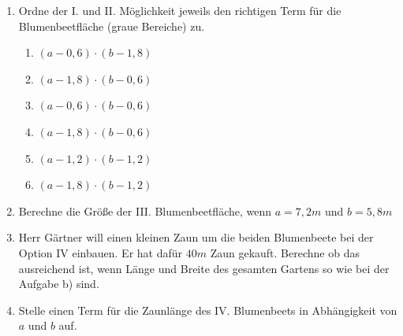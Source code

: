 \documentclass[a4paper,12pt]{article}
\newcommand{\Aufgabe}[1]{
  {
  \vspace*{0.5cm}
  \textsf{\textbf{Aufgabe #1}}
  \vspace*{0.2cm}
  
  }
}
\begin{document}
\begin{enumerate}[label={\alph*)}]
  \item Ordne der I. und II. Möglichkeit jeweils den richtigen Term für die Blumenbeetfläche (graue Bereiche) zu.


\begin{minipage}[t]{0.45\textwidth}
    \begin{enumerate}[label=\arabic*.]
    \item $(a-0,6)\cdot (b-1,8)$
    \item $(a-1,8)\cdot (b-0,6)$
    \item $(a-0,6)\cdot (b-0,6)$
  \end{enumerate}
\end{minipage}
\hspace*{0.15cm}
\begin{minipage}[t]{0.35\textwidth}
    \begin{enumerate}[label=\arabic*.]
    \setcounter{enumii}{3}
    \item $(a-1,8)\cdot (b-0,6)$
    \item $(a-1,2)\cdot (b-1,2)$
    \item $(a-1,8)\cdot (b-1,2)$
  \end{enumerate}
\end{minipage}
    \vspace{10mm}


  \item Berechne die Größe der III. Blumenbeetfläche, wenn $a=7,2m$ und $b=5,8m$
    \vspace{50mm}
  \item Herr Gärtner will einen kleinen Zaun um die beiden Blumenbeete bei der Option IV einbauen. Er hat dafür $40m$ Zaun gekauft. Berechne ob das ausreichend ist, wenn Länge und Breite des gesamten Gartens so wie bei der Aufgabe b) sind.
    \vspace{55mm}
  \item Stelle einen Term für die Zaunlänge des IV. Blumenbeets in Abhängigkeit von $a$ und $b$ auf.
\end{enumerate}


\vspace{1cm}




\end{document}
